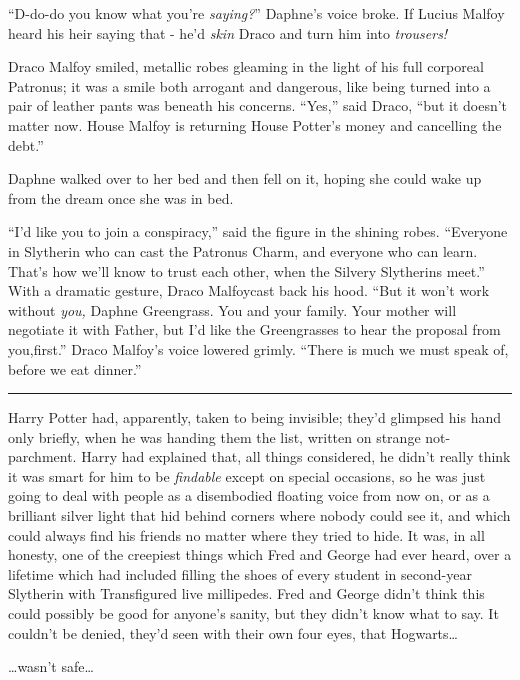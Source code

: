 ``D-do-do you know what you're \emph{saying?}'' Daphne's voice broke. If Lucius Malfoy heard his heir saying that - he'd \emph{skin} Draco and turn him into \emph{trousers!}

Draco Malfoy smiled, metallic robes gleaming in the light of his full corporeal Patronus; it was a smile both arrogant and dangerous, like being turned into a pair of leather pants was beneath his concerns. ``Yes,'' said Draco, ``but it doesn't matter now. House Malfoy is returning House Potter's money and cancelling the debt.''

Daphne walked over to her bed and then fell on it, hoping she could wake up from the dream once she was in bed.

``I'd like you to join a conspiracy,'' said the figure in the shining robes. ``Everyone in Slytherin who can cast the Patronus Charm, and everyone who can learn. That's how we'll know to trust each other, when the Silvery Slytherins meet.'' With a dramatic gesture, Draco Malfoycast back his hood. ``But it won't work without \emph{you,} Daphne Greengrass. You and your family. Your mother will negotiate it with Father, but I'd like the Greengrasses to hear the proposal from you,first.'' Draco Malfoy's voice lowered grimly. ``There is much we must speak of, before we eat dinner.''

\begin{center}\rule{3in}{0.4pt}\end{center}

Harry Potter had, apparently, taken to being invisible; they'd glimpsed his hand only briefly, when he was handing them the list, written on strange not-parchment. Harry had explained that, all things considered, he didn't really think it was smart for him to be \emph{findable} except on special occasions, so he was just going to deal with people as a disembodied floating voice from now on, or as a brilliant silver light that hid behind corners where nobody could see it, and which could always find his friends no matter where they tried to hide. It was, in all honesty, one of the creepiest things which Fred and George had ever heard, over a lifetime which had included filling the shoes of every student in second-year Slytherin with Transfigured live millipedes. Fred and George didn't think this could possibly be good for anyone's sanity, but they didn't know what to say. It couldn't be denied, they'd seen with their own four eyes, that Hogwarts\ldots{}

\ldots{}wasn't safe\ldots{}

